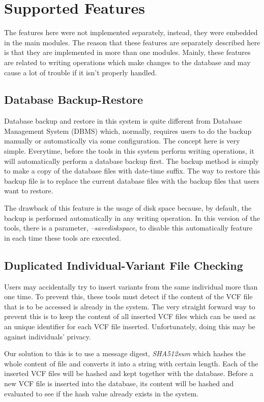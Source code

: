 \documentclass[a4paper,11pt]{kth-mag}
\begin{document}
\section{Supported Features}
\label{sec:support_features}
The features here were not implemented separately, instead, they were embedded in the main modules. The reason that these features are separately described here is that they are implemented in more than one modules. Mainly, these features are related to writing operations which make changes to the database and may cause a lot of trouble if it isn't properly handled.

\subsection{Database Backup-Restore}
\label{sec:database_backup_restore}
Database backup and restore in this system is quite different from Database Management System (DBMS) which, normally, requires users to do the backup manually or automatically via some configuration. The concept here is very simple. Everytime, before the tools in this system perform writing operations, it will automatically perform a database backup first. The backup method is simply to make a copy of the database files with date-time suffix. The way to restore this backup file is to replace the current database files with the backup files that users want to restore.

The drawback of this feature is the usage of disk space because, by default, the backup is performed automatically in any writing operation. In this version of the tools, there is a parameter, \emph{--savediskspace}, to disable this automatically feature in each time these tools are executed. 

\subsection{Duplicated Individual-Variant File Checking}
\label{sec:duplicated_individual_variants_checking}
Users may accidentally try to insert variants from the same individual more than one time. To prevent this, these tools must detect if the content of the VCF file that is to be accessed is already in the system. The very straight forward way to prevent this is to keep the content of all inserted VCF files which can be used as an unique identifier for each VCF file inserted. Unfortunately, doing this may be against individuals' privacy. 

Our solution to this is to use a message digest, \emph{SHA512sum} which hashes the whole content of file and converts it into a string with certain length. Each of the inserted VCF files will be hashed and kept together with the database. Before a new VCF file is inserted into the database, its content will be hashed and evaluated to see if the hash value already exists in the system.
\end{document}
